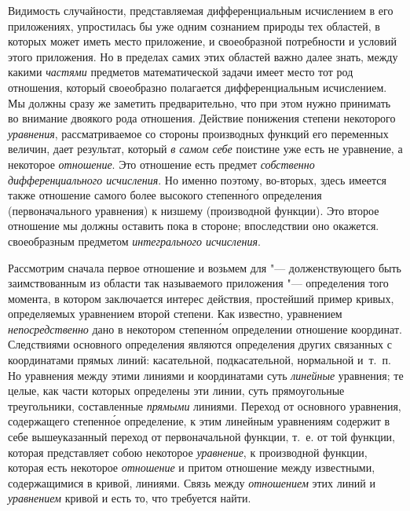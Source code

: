 Видимость случайности, представляемая дифференциальным исчислением в его
приложениях, упростилась бы уже одним сознанием природы тех областей, в которых
может иметь место приложение, и своеобразной потребности и условий этого
приложения. Но в пределах самих этих областей важно далее знать, между какими
{\em частями} предметов математической задачи имеет место тот род отношения,
который своеобразно полагается дифференциальным исчислением. Мы должны сразу же
заметить предварительно, что при этом нужно принимать во внимание двоякого рода
отношения. Действие понижения степени некоторого {\em уравнения},
рассматриваемое со стороны производных функций его переменных величин, дает
результат, который {\em в самом себе} поистине уже есть не уравнение,
а некоторое {\em отношение}. Это отношение есть предмет
{\em собственно дифференциального исчисления}. Но именно поэтому, во-вторых,
здесь имеется также отношение самого более высокого степенн\'{о}го определения
(первоначального уравнения) к низшему (производной функции). Это второе
отношение мы должны оставить пока в стороне; впоследствии оно окажется.
своеобразным предметом {\em интегрального исчисления}.

Рассмотрим сначала первое отношение и возьмем для "--- долженствующего быть
заимствованным из области так называемого приложения "--- определения того
момента, в котором заключается интерес действия, простейший пример кривых,
определяемых уравнением второй степени. Как известно, уравнением
{\em непосредственно} дано в некотором степенн\'{о}м определении отношение
координат. Следствиями основного определения являются определения других
связанных с координатами прямых линий: касательной, подкасательной, нормальной
и~т.~п. Но уравнения между этими линиями и координатами суть {\em линейные}
уравнения; те целые, как части которых определены эти линии, суть прямоугольные
треугольники, составленные {\em прямыми} линиями. Переход от основного
уравнения, содержащего степенн\'{о}е определение, к этим линейным уравнениям
содержит в себе вышеуказанный переход от первоначальной функции, т.~е. от той
функции, которая представляет собою некоторое {\em уравнение}, к производной
функции, которая есть некоторое {\em отношение} и притом отношение между
известными, содержащимися в кривой, линиями. Связь между {\em отношением} этих
линий и {\em уравнением} кривой и есть то, что требуется найти.

